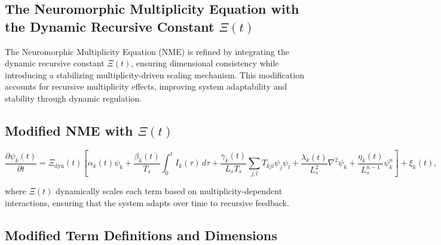 \documentclass{article}
\theoremstyle{plain}
\begin{document}
\begin{itemize}
\section{The Neuromorphic Multiplicity Equation with the Dynamic Recursive Constant \(\Xi(t) \)}

The Neuromorphic Multiplicity Equation (NME) is refined by integrating the dynamic recursive constant \(\Xi(t) \), ensuring dimensional consistency while introducing a stabilizing multiplicity-driven scaling mechanism. This modification accounts for recursive multiplicity effects, improving system adaptability and stability through dynamic regulation.

\subsection{Modified NME with \(\Xi(t) \)}

\begin{equation}
\frac{\partial \psi_k(t)}{\partial t} = \Xi_{\text{dyn}}(t) \left[ \alpha_k(t) \psi_k + \frac{\beta_k(t)}{T_s} \int_0^t I_k(\tau) \, d\tau + \frac{\gamma_k(t)}{L_s T_s} \sum_{j,l} T_{kjl} \psi_j \psi_l + \frac{\lambda_k(t)}{L_s^2} \nabla^2 \psi_k + \frac{\eta_k(t)}{L_s^{n-1}} \psi_k^n \right] + \xi_k(t),
\end{equation}

where \(\Xi(t) \) dynamically scales each term based on multiplicity-dependent interactions, ensuring that the system adapts over time to recursive feedback.

\subsection{Modified Term Definitions and Dimensions}


\end{itemize}
\end{document}
